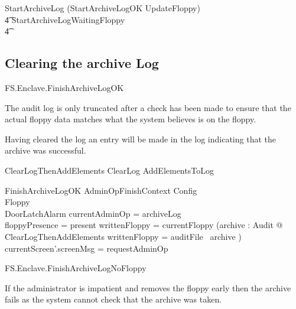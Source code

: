 \begin{zed}
        StartArchiveLog  (StartArchiveLogOK \semi UpdateFloppy) 
\\ \t4                  \lor StartArchiveLogWaitingFloppy
\\ \t4  \lor
        [~ BadAdminLogout | enclaveStatus = waitingStartAdminOp 
\\ \t6                          \land \The currentAdminOp = archiveLog 
                                ~]
\end{zed}


\subsection{Clearing the archive Log}

\begin{traceunit}{FS.Enclave.FinishArchiveLogOK}
\end{traceunit}

The audit log is only truncated after a check has been made to ensure
that the actual floppy data matches what the system believes is on the
floppy. 

Having cleared the log an entry will be made in the log indicating
that the archive was successful.

\begin{zed}
        ClearLogThenAddElements  ClearLog \semi AddElementsToLog
\end{zed}

\begin{schema}{FinishArchiveLogOK}
        AdminOpFinishContext
\also
        \Xi Config
\\      \Xi Floppy
\\      \Xi DoorLatchAlarm
\where
        \The currentAdminOp = archiveLog
\\      floppyPresence = present
\also
        writtenFloppy = currentFloppy
\also
        (\exists archive : \finset Audit @ ClearLogThenAddElements
         \land
        writtenFloppy = auditFile~ archive )
\also
        currentScreen'.screenMsg = requestAdminOp
\end{schema}


\begin{traceunit}{FS.Enclave.FinishArchiveLogNoFloppy}
\end{traceunit}

If the administrator is impatient and removes the floppy early then
the archive fails as the system cannot check that the archive was taken.

